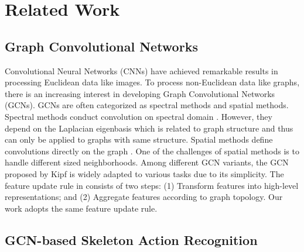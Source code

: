 \documentclass[10pt,twocolumn,letterpaper]{article}
\begin{document}
\section{Related Work}

\subsection{Graph Convolutional Networks}

Convolutional Neural Networks (CNNs) have achieved remarkable results in processing Euclidean data like images. To process non-Euclidean data like graphs, there is an increasing interest in developing Graph Convolutional Networks (GCNs). GCNs are often categorized as spectral methods and spatial methods. Spectral methods conduct convolution on spectral domain \cite{bruna2013spectral,defferrard2016convolutional,kipf2016semi}. However, they depend on the Laplacian eigenbasis which is related to graph structure and thus can only be applied to graphs with same structure. Spatial methods define convolutions directly on the graph \cite{duvenaud2015convolutional,niepert2016learning,velivckovic2017graph}. One of the challenges of spatial methods is to handle different sized neighborhoods. Among different GCN variants, the GCN proposed by Kipf \etal \cite{kipf2016semi} is widely adapted to various tasks due to its simplicity. The feature update rule in \cite{kipf2016semi} consists of two steps: (1) Transform features into high-level representations; and (2) Aggregate features according to graph topology. Our work adopts the same feature update rule. \subsection{GCN-based Skeleton Action Recognition}
\end{document}
